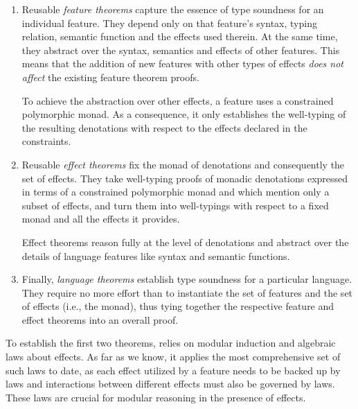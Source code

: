 \begin{enumerate}
\item Reusable \emph{feature theorems} capture the essence
      of type soundness for an individual feature. 
      They depend only on that feature's syntax, typing relation, semantic function and the
      effects used therein. At the same time,
      they abstract over the syntax, semantics and effects of other features.
      This means that the addition of new features with other types of effects 
      \emph{does not affect} the existing feature theorem proofs. 

      To achieve the abstraction over other effects, a feature uses a constrained
      polymorphic monad. As a consequence, it only establishes the well-typing of the resulting
      denotations with respect to the effects declared in the constraints. 

\item Reusable \emph{effect theorems} fix the monad of denotations and consequently
      the set of effects. They take well-typing proofs of monadic denotations 
      expressed in terms of a constrained polymorphic monad and which mention only a subset of
      effects, and turn them into well-typings with respect to a fixed monad and all the effects it
      provides.
      
      Effect theorems reason fully at the level of denotations and
      abstract over the details of language features like syntax and semantic
      functions.




\item Finally, \emph{language theorems} 
      establish type soundness for a particular language. 
      They require no more effort than to 
      instantiate the set of features and the set of effects (i.e., the monad), 
      thus tying together the respective feature and effect theorems into an overall proof.
\end{enumerate}
To establish the first two theorems, \name relies on modular induction and algebraic
laws about effects. As far as we know, it applies
the most comprehensive set of such laws to date, as
each effect utilized by a feature needs to
be backed up by laws and interactions between different
effects must also be governed by laws. These laws are crucial for
modular reasoning in the presence of effects.

